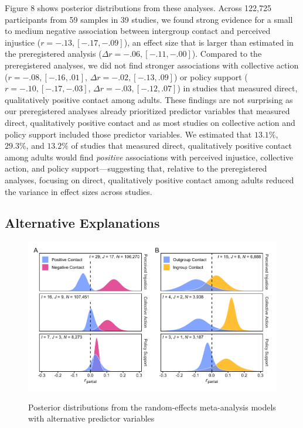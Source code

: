 \documentclass[12pt, letterpaper]{article}
\begin{document}
Figure 8 shows posterior distributions from these analyses. Across
122,725 participants from 59 samples in 39 studies, we found strong
evidence for a small to medium negative association between intergroup
contact and perceived injustice (\(r = -.13, [-.17, -.09]\)), an effect
size that is larger than estimated in the preregistered analysis
(\(\Delta r = -.06, [-.11, -.00]\)). Compared to the preregistered
analyses, we did not find stronger associations with collective action
(\(r = -.08, [-.16, .01]\), \(\Delta r = -.02, [-.13, .09]\)) or policy
support (\(r = -.10, [-.17, -.03]\), \(\Delta r = -.03, [-.12, .07]\))
in studies that measured direct, qualitatively positive contact among
adults. These findings are not surprising as our preregistered analyses
already prioritized predictor variables that measured direct,
qualitatively positive contact and as most studies on collective action
and policy support included those predictor variables. We estimated that
\(13.1\%\), \(29.3\%\), and \(13.2\%\) of studies that measured direct,
qualitatively positive contact among adults would find \emph{positive}
associations with perceived injustice, collective action, and policy
support---suggesting that, relative to the preregistered analyses,
focusing on direct, qualitatively positive contact among adults reduced
the variance in effect sizes across studies.

\hypertarget{alternative-explanations}{%
\subsection{Alternative Explanations}\label{alternative-explanations}}

\begin{figure}[t!]
\centering
\caption{Posterior distributions from the random-effects meta-analysis models with alternative predictor variables}
\includegraphics[scale=1]{../figures/figure-9}
\label{fig:f9}
\end{figure}
\end{document}
